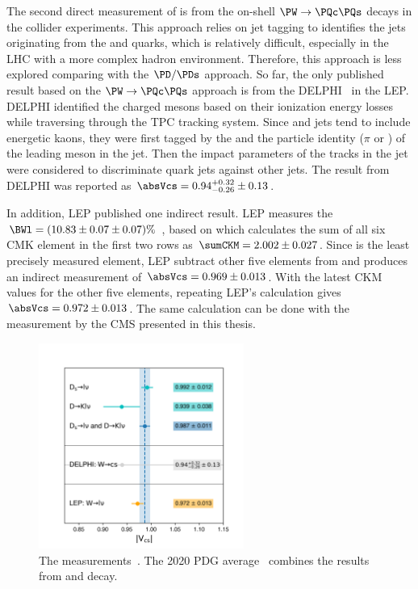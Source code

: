 The second direct measurement of \absVcs is from the on-shell $\PW\to \PQc \PQs$ decays in the collider experiments. This approach relies on jet tagging to identifies the jets originating from the \PQc and \PQs quarks, which is relatively difficult, especially in the LHC with a more complex hadron environment. Therefore, this approach is less explored comparing with the $\PD/\PDs$ approach. So far, the only published result based on the $\PW\to \PQc \PQs$  approach is from the DELPHI~\cite{Abreu:1998ap} in the LEP. DELPHI identified the charged mesons based on their ionization energy losses while traversing through the TPC tracking system. Since \PQs and \PQc jets tend to include energetic kaons, they were first tagged by the \pt and the particle identity ($\pi$ or \PK) of the leading meson in the jet. Then the impact parameters of the tracks in the jet were considered to discriminate \PQc quark jets against other jets. The result from DELPHI was reported as $\absVcs=0.94 ^{+0.32}_{-0.26}\pm 0.13$. 

In addition, LEP published one indirect result. LEP measures the $\BWl = (10.83 \pm 0.07 \pm 0.07) \%$ \cite{Schael:2013ita}, based on which calculates the sum of all six CMK element in the first two rows as $\sumCKM = 2.002 \pm 0.027$. Since \absVcs is the least precisely measured element, LEP subtract other five elements from \sumCKM and produces an indirect measurement of $\absVcs=0.969\pm 0.013$. With the latest CKM values for the other five elements, repeating LEP's calculation gives $\absVcs=0.972\pm 0.013$. The same calculation can be done with the \BWl measurement by the CMS presented in this thesis.


 \begin{figure}
    \centering
    \includegraphics[width=0.6\textwidth]{chapters/introduction/sectionRelatedWorks/figures/vcs0.png}
    \caption{The \absVcs measurements~\cite{pdg2020}. The 2020 PDG average~\cite{pdg2020} combines the results from \PD and \PDs decay.}
    \label{fig:introduction:relatedWorks:vcs}
\end{figure}
